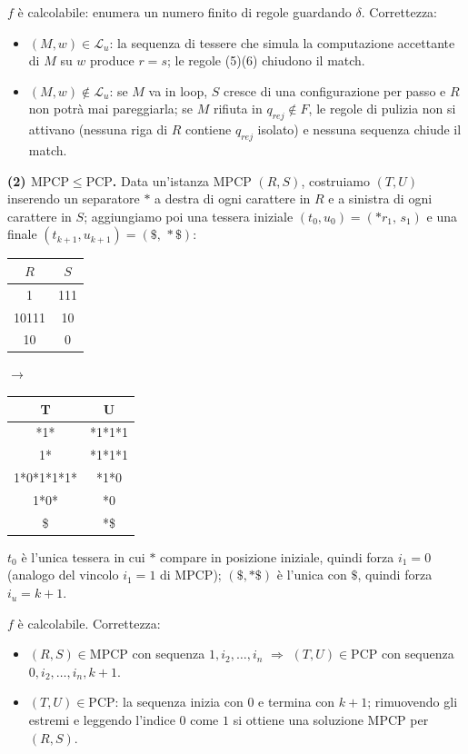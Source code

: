{  $ f $ è calcolabile: enumera un numero finito di regole guardando $ \delta $. Correttezza:
  \begin{itemize}
    \item $ (M,w) \in \mathcal{L}_u $: la sequenza di tessere che simula la computazione accettante di $ M $ su $ w $ produce $ r = s $; le regole (5)(6) chiudono il match.
    \item $ (M,w) \notin \mathcal{L}_u $: se $ M $ va in loop, $ S $ cresce di una configurazione per passo e $ R $ non potrà mai pareggiarla; se $ M $ rifiuta in $ q_{rej} \notin F $, le regole di pulizia non si attivano (nessuna riga di $ R $ contiene $ q_{rej} $ isolato) e nessuna sequenza chiude il match.
  \end{itemize}

  \medskip
  \textbf{(2) $ \mathrm{MPCP} \leq \mathrm{PCP} $.}
  Data un'istanza MPCP $ (R, S) $, costruiamo $ (T, U) $ inserendo un separatore $ * $ a destra di ogni carattere in $ R $ e a sinistra di ogni carattere in $ S $; aggiungiamo poi una tessera iniziale $ (t_0, u_0) = (*r_1,\, s_1) $ e una finale $ (t_{k+1}, u_{k+1}) = (\$,\, *\$) $:
  \begin{center}
    \begin{tabular}{c|c}
      $ R $ & $ S  $\\ \hline
      1 & 111\\
      10111 & 10\\
      10 & 0
    \end{tabular} $ \longrightarrow $
    \begin{tabular}{c|c}
      T & U\\ \hline
      *1* & *1*1*1\\ \hline
      1* & *1*1*1\\
      1*0*1*1*1* & *1*0\\
      1*0* & *0\\ \hline
      \$ & *\$
    \end{tabular}
  \end{center}
  $ t_0 $ è l'unica tessera in cui $ * $ compare in posizione iniziale, quindi forza $ i_1 = 0 $ (analogo del vincolo $ i_1 = 1 $ di MPCP); $ (\$, *\$) $ è l'unica con $ \$ $, quindi forza $ i_u = k+1 $.

  $ f $ è calcolabile. Correttezza:
  \begin{itemize}
    \item $ (R,S) \in \mathrm{MPCP} $ con sequenza $ 1, i_2, \ldots, i_n $ $ \Rightarrow $ $ (T,U) \in \mathrm{PCP} $ con sequenza $ 0, i_2, \ldots, i_n, k+1 $.
    \item $ (T,U) \in \mathrm{PCP} $: la sequenza inizia con $ 0 $ e termina con $ k+1 $; rimuovendo gli estremi e leggendo l'indice $ 0 $ come $ 1 $ si ottiene una soluzione MPCP per $ (R,S) $.
  \end{itemize}
}
